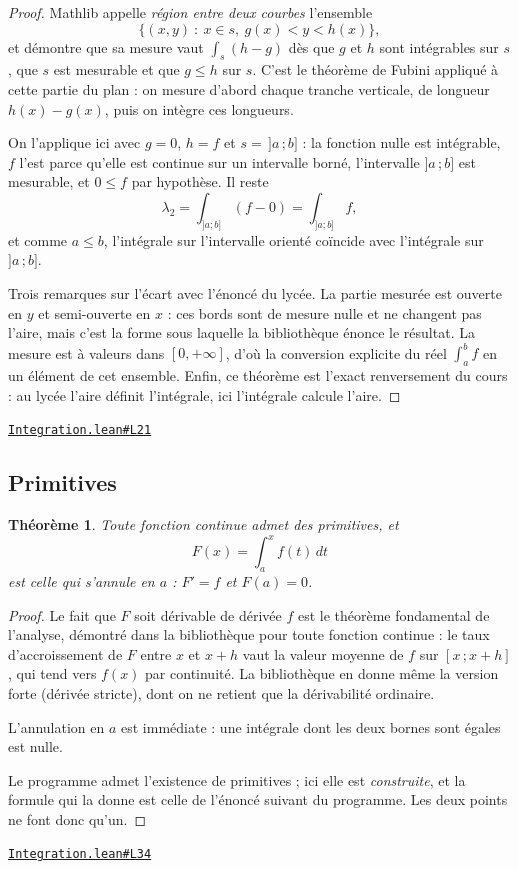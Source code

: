 \documentclass[11pt,a4paper]{article}
\theoremstyle{definition}
\theoremstyle{plain}
\newtheorem{theoreme}{Théorème}
\newcommand{\source}[2]{\par\smallskip\noindent\hfill{\footnotesize\href{#1}{\texttt{#2}}}\par\smallskip}
\begin{document}
\begin{proof}
Mathlib appelle \emph{région entre deux courbes} l'ensemble
\[ \{(x, y) \ :\ x \in s,\ g(x) < y < h(x)\} , \]
et démontre que sa mesure vaut $\int_s (h - g)$ dès que $g$ et $h$ sont intégrables sur
$s$, que $s$ est mesurable et que $g \le h$ sur $s$. C'est le théorème de Fubini appliqué
à cette partie du plan : on mesure d'abord chaque tranche verticale, de longueur
$h(x) - g(x)$, puis on intègre ces longueurs.

On l'applique ici avec $g = 0$, $h = f$ et $s = \,]a\,;b]$ : la fonction nulle est
intégrable, $f$ l'est parce qu'elle est continue sur un intervalle borné, l'intervalle
$]a\,;b]$ est mesurable, et $0 \le f$ par hypothèse. Il reste
\[ \lambda_2 = \int_{]a;b]} (f - 0) = \int_{]a;b]} f , \]
et comme $a \le b$, l'intégrale sur l'intervalle orienté coïncide avec l'intégrale sur
$]a\,;b]$.

\medskip\noindent
Trois remarques sur l'écart avec l'énoncé du lycée. La partie mesurée est ouverte en $y$
et semi-ouverte en $x$ : ces bords sont de mesure nulle et ne changent pas l'aire, mais
c'est la forme sous laquelle la bibliothèque énonce le résultat. La mesure est à valeurs
dans $[0, +\infty]$, d'où la conversion explicite du réel $\int_a^b f$ en un élément de cet
ensemble. Enfin, ce théorème est l'exact renversement du cours : au lycée l'aire définit
l'intégrale, ici l'intégrale calcule l'aire.
\end{proof}
\source{https://github.com/Commutator-IO/learn-lean/blob/main/cours/02-lycee/06-integration/Integration.lean\#L21}{Integration.lean\#L21}

\subsection{Primitives}

\begin{theoreme}
Toute fonction continue admet des primitives, et
\[ F(x) = \int_a^x f(t)\,dt \]
est celle qui s'annule en $a$ : $F' = f$ et $F(a) = 0$.
\end{theoreme}

\begin{proof}
Le fait que $F$ soit dérivable de dérivée $f$ est le théorème fondamental de l'analyse,
démontré dans la bibliothèque pour toute fonction continue : le taux d'accroissement de
$F$ entre $x$ et $x + h$ vaut la valeur moyenne de $f$ sur $[x\,;x+h]$, qui tend vers
$f(x)$ par continuité. La bibliothèque en donne même la version forte (dérivée stricte),
dont on ne retient que la dérivabilité ordinaire.

L'annulation en $a$ est immédiate : une intégrale dont les deux bornes sont égales est
nulle.

\medskip\noindent
Le programme admet l'existence de primitives ; ici elle est \emph{construite}, et la
formule qui la donne est celle de l'énoncé suivant du programme. Les deux points ne font
donc qu'un.
\end{proof}
\source{https://github.com/Commutator-IO/learn-lean/blob/main/cours/02-lycee/06-integration/Integration.lean\#L34}{Integration.lean\#L34}
\end{document}
